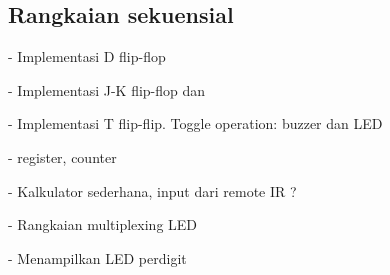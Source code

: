 \subsection{Rangkaian sekuensial}

- Implementasi D flip-flop

- Implementasi J-K flip-flop dan

- Implementasi T flip-flip. Toggle operation: buzzer dan LED

- register, counter

- Kalkulator sederhana, input dari remote IR ?

- Rangkaian multiplexing LED

- Menampilkan LED perdigit


